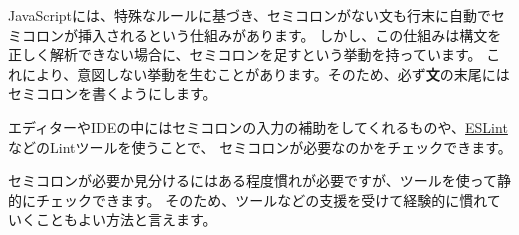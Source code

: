 JavaScriptには、特殊なルールに基づき、セミコロンがない文も行末に自動でセミコロンが挿入されるという仕組みがあります。
しかし、この仕組みは構文を正しく解析できない場合に、セミコロンを足すという挙動を持っています。
これにより、意図しない挙動を生むことがあります。そのため、必ず\textbf{文}の末尾にはセミコロンを書くようにします。

エディターやIDEの中にはセミコロンの入力の補助をしてくれるものや、\href{http://eslint.org/}{ESLint}などのLintツールを使うことで、
セミコロンが必要なのかをチェックできます。

セミコロンが必要か見分けるにはある程度慣れが必要ですが、ツールを使って静的にチェックできます。
そのため、ツールなどの支援を受けて経験的に慣れていくこともよい方法と言えます。
